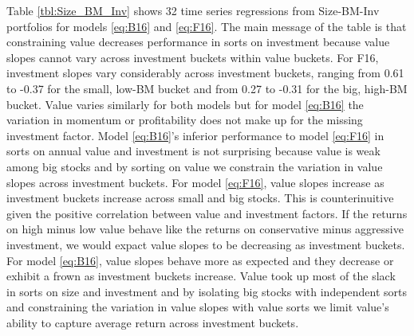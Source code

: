 
Table \ref{tbl:Size_BM_Inv} shows 32 time series regressions from Size-BM-Inv
portfolios for models \ref{eq:B16} and \ref{eq:F16}.
The main message of the table is that constraining value decreases performance
in sorts on investment because value slopes cannot vary across investment
buckets within value buckets.
For F16, investment slopes vary considerably across investment buckets, ranging
from 0.61 to -0.37 for the small, low-BM bucket and from 0.27 to -0.31 for the
big, high-BM bucket.
Value varies similarly for both models but for model \ref{eq:B16} the variation
in momentum or profitability does not make up for the missing investment
factor.
Model \ref{eq:B16}'s inferior performance to model \ref{eq:F16} in sorts on
annual value and investment is not surprising because value is weak among
big stocks and by sorting on value we constrain the variation in value slopes
across investment buckets.
For model \ref{eq:F16}, value slopes increase as investment buckets increase
across small and big stocks.
This is counterinuitive given the positive correlation between value and
investment factors.
If the returns on high minus low value behave like the returns on conservative
minus aggressive investment, we would expact value slopes to be decreasing as
investment buckets.
For model \ref{eq:B16}, value slopes behave more as expected and they decrease
or exhibit a frown as investment buckets increase.
Value took up most of the slack in sorts on size and investment and by
isolating big stocks with independent sorts and constraining the variation in
value slopes with value sorts we limit value's ability to capture average
return across investment buckets.
